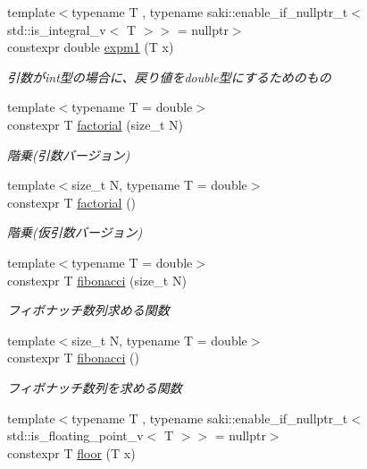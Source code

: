 \begin{DoxyCompactItemize}
{\footnotesize template$<$typename T , typename saki\+::enable\+\_\+if\+\_\+nullptr\+\_\+t$<$ std\+::is\+\_\+integral\+\_\+v$<$ T $>$$>$  = nullptr$>$ }\\constexpr double \mbox{\hyperlink{namespacesaki_ae4490f448ed3d82712306c54d6821788}{expm1}} (T x)
\begin{DoxyCompactList}\small\item\em 引数がint型の場合に、戻り値をdouble型にするためのもの \end{DoxyCompactList}\item 
{\footnotesize template$<$typename T  = double$>$ }\\constexpr T \mbox{\hyperlink{namespacesaki_a224c4843b72acf995e13809a5caaafd8}{factorial}} (size\+\_\+t N)
\begin{DoxyCompactList}\small\item\em 階乗(引数バージョン) \end{DoxyCompactList}\item 
{\footnotesize template$<$size\+\_\+t N, typename T  = double$>$ }\\constexpr T \mbox{\hyperlink{namespacesaki_a9dead910b791cee99cf82d1bd2a5d90c}{factorial}} ()
\begin{DoxyCompactList}\small\item\em 階乗(仮引数バージョン) \end{DoxyCompactList}\item 
{\footnotesize template$<$typename T  = double$>$ }\\constexpr T \mbox{\hyperlink{namespacesaki_a93bb6ae29766c4204c1cf8dc5bab007c}{fibonacci}} (size\+\_\+t N)
\begin{DoxyCompactList}\small\item\em フィボナッチ数列求める関数 \end{DoxyCompactList}\item 
{\footnotesize template$<$size\+\_\+t N, typename T  = double$>$ }\\constexpr T \mbox{\hyperlink{namespacesaki_a7bbb434ee3c6d77eeb32b85bb9e316f0}{fibonacci}} ()
\begin{DoxyCompactList}\small\item\em フィボナッチ数列を求める関数 \end{DoxyCompactList}\item 
{\footnotesize template$<$typename T , typename saki\+::enable\+\_\+if\+\_\+nullptr\+\_\+t$<$ std\+::is\+\_\+floating\+\_\+point\+\_\+v$<$ T $>$$>$  = nullptr$>$ }\\constexpr T \mbox{\hyperlink{namespacesaki_a0718c031975604811084b62bbba93f7f}{floor}} (T x)

\end{DoxyCompactItemize}
